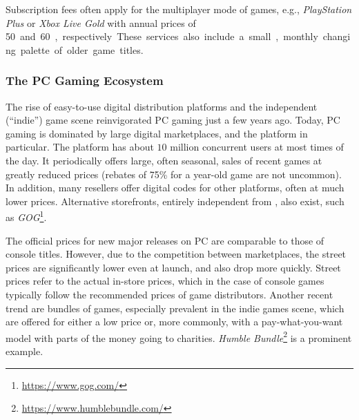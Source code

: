 
Subscription fees often apply for the multiplayer mode of games, e.g., \textit{PlayStation Plus} or \textit{Xbox Live Gold} with annual prices of \SI{50}[\EUR] and \SI{60}[\EUR], respectively. These services also include a small, monthly changing palette of older game titles.




\subsubsection{The PC Gaming Ecosystem}
\label{sec:pcgaming}

The rise of easy-to-use digital distribution platforms and the independent (``indie'') game scene reinvigorated PC gaming just a few years ago. Today, PC gaming is dominated by large digital marketplaces, and the \steam platform in particular. The platform has about $10$ million concurrent users at most times of the day. It periodically offers large, often seasonal, sales of recent games at greatly reduced prices (rebates of 75\% for a year-old game are not uncommon). In addition, many resellers offer digital codes for other platforms, often at much lower prices. Alternative storefronts, entirely independent from \steam, also exist, such as \textit{GOG}\footnote{\url{https://www.gog.com/}}.%


The official prices for new major releases on PC are comparable to those of console titles. However, due to the competition between marketplaces, the street prices are significantly lower even at launch, and also drop more quickly. Street prices refer to the actual in-store prices, which in the case of console games typically follow the recommended prices of game distributors. Another recent trend are bundles of games, especially prevalent in the indie games scene, which are offered for either a low price or, more commonly, with a pay-what-you-want model with parts of the money going to charities. \textit{Humble Bundle}\footnote{\url{https://www.humblebundle.com/}} is a prominent example. %

